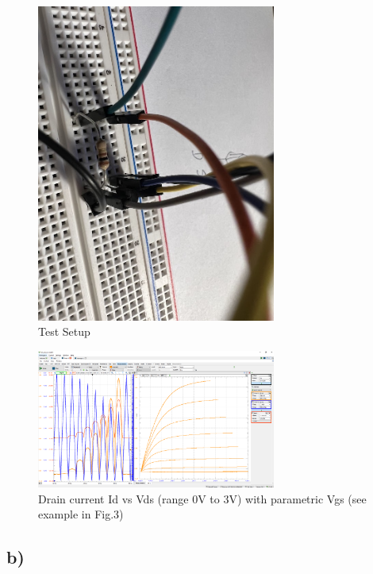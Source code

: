 \documentclass{article}
\begin{document}
	\begin{figure}[H]
	    \centering
	    \includegraphics[width=0.7\textwidth]{3a-photo}
	    \caption{Test Setup}
	\end{figure}

	
	\begin{figure}[H]
	    \centering
	    \includegraphics[width=0.7\textwidth]{3a}
	    \caption{Drain current Id vs Vds (range 0V to 3V) with parametric Vgs (see example in Fig.3)}
	\end{figure}

	\subsection*{b)}
	
\end{document}
